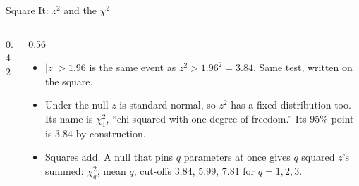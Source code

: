 \documentclass[aspectratio=169,11pt,xcolor=dvipsnames]{beamer}
\begin{document}
\begin{frame}{Square It: $z^2$ and the $\chi^2$}
\begin{columns}[c]
\begin{column}{0.42\textwidth}
\centering
{}
\end{column}
\begin{column}{0.56\textwidth}
\begin{itemize}\itemsep4pt
  \item $|z| > 1.96$ is the same event as $z^2 > 1.96^2 = 3.84$. Same
        test, written on the square.
  \item Under the null $z$ is standard normal, so $z^2$ has a fixed
        distribution too. Its name is $\chi^2_1$, ``chi-squared with one
        degree of freedom.'' Its 95\% point is $3.84$ by construction.
  \item Squares add. A null that pins $q$ parameters at once gives $q$
        squared $z$'s summed: $\chi^2_q$, mean $q$, cut-offs $3.84$,
        $5.99$, $7.81$ for $q = 1, 2, 3$.
\end{itemize}
\end{column}
\end{columns}
\end{frame}
\end{document}
